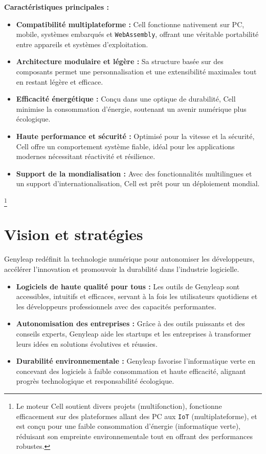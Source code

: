 \documentclass[a4paper,12pt,openany]{book}
\begin{document}
\textbf{Caractéristiques principales :}
\begin{itemize}
    \item \textbf{Compatibilité multiplateforme :} Cell fonctionne nativement sur PC, mobile, systèmes embarqués et \texttt{WebAssembly}, offrant une véritable portabilité entre appareils et systèmes d'exploitation.
    \item \textbf{Architecture modulaire et légère :} Sa structure basée sur des composants permet une personnalisation et une extensibilité maximales tout en restant légère et efficace.
    \item \textbf{Efficacité énergétique :} Conçu dans une optique de durabilité, Cell minimise la consommation d'énergie, soutenant un avenir numérique plus écologique.
    \item \textbf{Haute performance et sécurité :} Optimisé pour la vitesse et la sécurité, Cell offre un comportement système fiable, idéal pour les applications modernes nécessitant réactivité et résilience.
    \item \textbf{Support de la mondialisation :} Avec des fonctionnalités multilingues et un support d'internationalisation, Cell est prêt pour un déploiement mondial.
\end{itemize}

\footnote{Le moteur Cell soutient divers projets (multifonction), fonctionne efficacement sur des plateformes allant des PC aux \texttt{IoT} (multiplateforme), et est conçu pour une faible consommation d'énergie (informatique verte), réduisant son empreinte environnementale tout en offrant des performances robustes.}

\chapter{Vision et stratégies}

Genyleap redéfinit la technologie numérique pour autonomiser les développeurs, accélérer l'innovation et promouvoir la durabilité dans l'industrie logicielle.

\begin{itemize}
    \item \textbf{Logiciels de haute qualité pour tous :} Les outils de Genyleap sont accessibles, intuitifs et efficaces, servant à la fois les utilisateurs quotidiens et les développeurs professionnels avec des capacités performantes.
    \item \textbf{Autonomisation des entreprises :} Grâce à des outils puissants et des conseils experts, Genyleap aide les startups et les entreprises à transformer leurs idées en solutions évolutives et réussies.
    \item \textbf{Durabilité environnementale :} Genyleap favorise l'informatique verte en concevant des logiciels à faible consommation et haute efficacité, alignant progrès technologique et responsabilité écologique.
\end{itemize}
\end{document}

